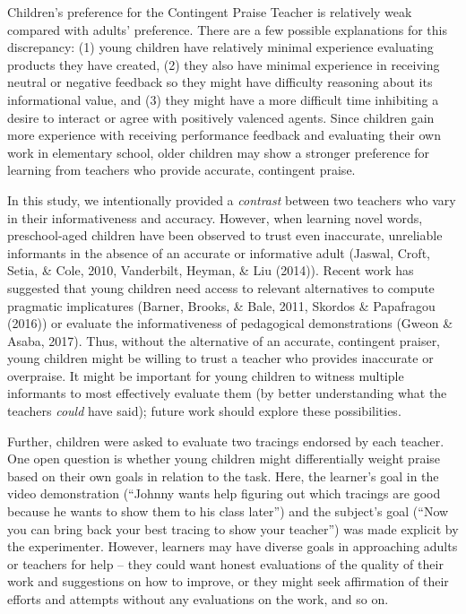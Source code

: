 \documentclass[10pt, letterpaper]{article}
\begin{document}
Children's preference for the Contingent Praise Teacher is relatively
weak compared with adults' preference. There are a few possible
explanations for this discrepancy: (1) young children have relatively
minimal experience evaluating products they have created, (2) they also
have minimal experience in receiving neutral or negative feedback so
they might have difficulty reasoning about its informational value, and
(3) they might have a more difficult time inhibiting a desire to
interact or agree with positively valenced agents. Since children gain
more experience with receiving performance feedback and evaluating their
own work in elementary school, older children may show a stronger
preference for learning from teachers who provide accurate, contingent
praise.

In this study, we intentionally provided a \textit{contrast} between two
teachers who vary in their informativeness and accuracy. However, when
learning novel words, preschool-aged children have been observed to
trust even inaccurate, unreliable informants in the absence of an
accurate or informative adult (Jaswal, Croft, Setia, \& Cole, 2010,
Vanderbilt, Heyman, \& Liu (2014)). Recent work has suggested that young
children need access to relevant alternatives to compute pragmatic
implicatures (Barner, Brooks, \& Bale, 2011, Skordos \& Papafragou
(2016)) or evaluate the informativeness of pedagogical demonstrations
(Gweon \& Asaba, 2017). Thus, without the alternative of an accurate,
contingent praiser, young children might be willing to trust a teacher
who provides inaccurate or overpraise. It might be important for young
children to witness multiple informants to most effectively evaluate
them (by better understanding what the teachers \textit{could} have
said); future work should explore these possibilities.

Further, children were asked to evaluate two tracings endorsed by each
teacher. One open question is whether young children might
differentially weight praise based on their own goals in relation to the
task. Here, the learner's goal in the video demonstration (``Johnny
wants help figuring out which tracings are good because he wants to show
them to his class later'') and the subject's goal (``Now you can bring
back your best tracing to show your teacher'') was made explicit by the
experimenter. However, learners may have diverse goals in approaching
adults or teachers for help -- they could want honest evaluations of the
quality of their work and suggestions on how to improve, or they might
seek affirmation of their efforts and attempts without any evaluations
on the work, and so on.
\end{document}
